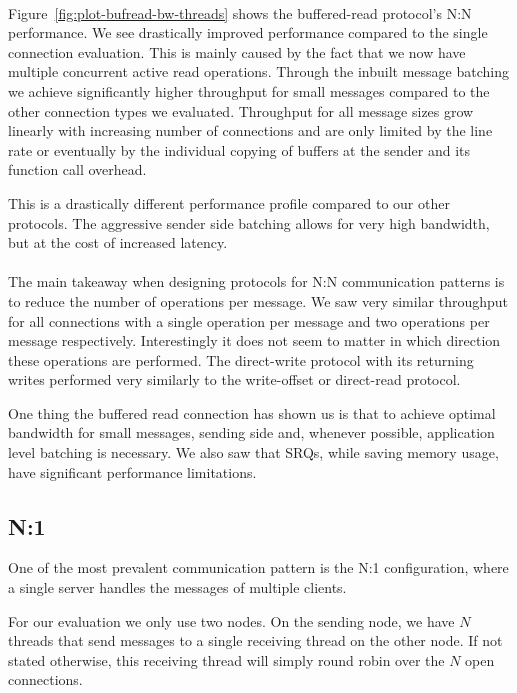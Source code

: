 \paragraph{} Figure~\ref{fig:plot-bufread-bw-threads} shows the buffered-read protocol's N:N performance. We see drastically 
improved performance compared to the single connection evaluation. This is mainly caused by the fact that we now have multiple
concurrent active read operations. Through the inbuilt message batching we achieve  significantly higher throughput for small
messages compared to the other connection types we evaluated. Throughput for all message sizes grow linearly with increasing 
number of connections and are only limited by the line rate or eventually by the individual copying of buffers at the sender 
and its function call overhead.

This is a drastically different performance profile compared to our other protocols. 
The aggressive sender side batching allows
for very high bandwidth, but at the cost of increased latency.


\paragraph{} The main takeaway when designing protocols for N:N communication patterns is to reduce the number of operations
per message. We saw very similar throughput for all connections with a single operation per message and two operations per
message respectively. Interestingly it does not seem to matter in which direction these operations are performed. The 
direct-write protocol with its returning writes performed very similarly to the write-offset or direct-read protocol.

One thing the buffered read connection has shown us is that to achieve optimal bandwidth for small messages, sending side and,
whenever possible, application level batching is necessary.  We also saw that SRQs, while saving memory usage, have 
significant performance limitations.



\pagebreak
\subsection{N:1}
One of the most prevalent communication pattern is the N:1 configuration, where a single server handles the messages
of multiple clients. 

For our evaluation we only use two nodes. On the sending node, we have $N$ threads that send messages to a
single receiving thread on the other node. If not stated otherwise, this receiving thread will simply 
round robin over the $N$ open connections. 

